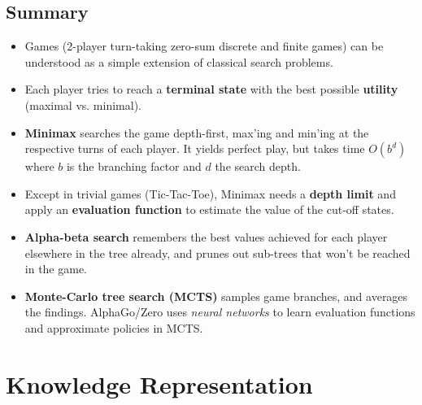 \documentclass[conference, a4paper]{styles/acmsiggraph}
\begin{document}
    \subsection{Summary}
        \begin{itemize}
            \item Games (2-player turn-taking zero-sum discrete and finite games) can be understood as a simple extension of classical search problems.
            \item Each player tries to reach a \textbf{terminal state} with the best possible \textbf{utility} (maximal vs. minimal).
            \item \textbf{Minimax} searches the game depth-first, max'ing and min'ing at the respective turns of each player. 
                It yields perfect play, but takes time $O(b^d)$ where $b$ is the branching factor and $d$ the search depth.
            \item Except in trivial games (Tic-Tac-Toe), Minimax needs a \textbf{depth limit} and apply an \textbf{evaluation function} to estimate the value of the cut-off states.
            \item \textbf{Alpha-beta search} remembers the best values achieved for each player elsewhere in the tree already, and prunes out sub-trees that won't be reached in the game.
            \item \textbf{Monte-Carlo tree search (MCTS)} samples game branches, and averages the findings. 
                AlphaGo/Zero uses \textit{neural networks} to learn evaluation functions and approximate policies in MCTS.
        \end{itemize}

\newpage    
    
\section{Knowledge Representation}
\end{document}
